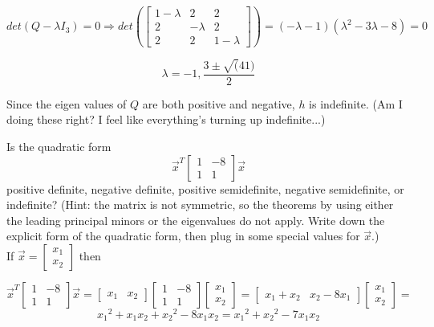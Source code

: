 \documentclass[12pt]{extarticle}
\theoremstyle{definition}
\begin{document}
\begin{problem}
\begin{description}
			$$det(Q - \lambda I_3) = 0 \Longrightarrow det(\begin{bmatrix}1-\lambda & 2 & 2\\ 2 & -\lambda & 2 \\ 2 & 2 & 1-\lambda\end{bmatrix}) = 
			(-\lambda - 1)({\lambda}^2 - 3\lambda - 8) = 0$$

			$$\lambda = -1, \frac{3 \pm \sqrt(41)}{2}$$

			Since the eigen values of $Q$ are both positive and negative, $h$ is indefinite. 
			(Am I doing these right? I feel like everything's turning up indefinite...)


	\end{description}
\end{problem}

\begin{problem}
	Is the quadratic form 
	\[\vec{x}^T \begin{bmatrix}1 & -8\\ 1 & 1 \end{bmatrix}\vec{x}\]
	positive definite, negative definite, positive semidefinite, negative semidefinite, or indefinite? (Hint: the matrix is not symmetric, so the theorems by using either the leading principal minors or the eigenvalues do not apply. Write down the explicit form of the quadratic form, then plug in some special values for $\vec{x}$.)\\

		If $\vec{x} = \begin{bmatrix}x_1\\x_2\end{bmatrix}$ then 

		$$\vec{x}^T \begin{bmatrix}1 & -8\\ 1 & 1 \end{bmatrix}\vec{x} = 
		\begin{bmatrix}x_1 & x_2\end{bmatrix}\begin{bmatrix}1 & -8\\ 1 & 1 \end{bmatrix}\begin{bmatrix}x_1\\x_2\end{bmatrix} = 
		\begin{bmatrix} x_1 + x_2 & x_2 - 8x_1\end{bmatrix}\begin{bmatrix}x_1\\x_2\end{bmatrix} = $$
		$${x_1}^2 + x_1 x_2 + {x_2}^2 - 8x_1 x_2 = {x_1}^2 + {x_2}^2 - 7x_1 x_2$$


\end{problem}
\end{document}
